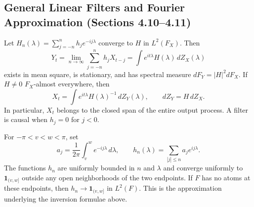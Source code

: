 \subsection{General Linear Filters and Fourier Approximation (Sections 4.10--4.11)}
\begin{theorem}
Let $H_n(\lambda)=\sum_{j=-n}^nh_je^{-ij\lambda}$ converge to $H$ in
$L^2(F_X)$. Then
\[
Y_t=\lim_{n\to\infty}\sum_{j=-n}^nh_jX_{t-j}
=\int e^{it\lambda}H(\lambda)\,dZ_X(\lambda)
\]
exists in mean square, is stationary, and has spectral measure
$dF_Y=|H|^2dF_X$. If $H\ne0$ $F_X$-almost everywhere, then
\[
X_t=\int e^{it\lambda}H(\lambda)^{-1}\,dZ_Y(\lambda),
\qquad dZ_Y=H\,dZ_X.
\]
In particular, $X_t$ belongs to the closed span of the entire output process.
A filter is causal when $h_j=0$ for $j<0$.
\end{theorem}
\begin{proposition}
For $-\pi<v<w<\pi$, set
\[
a_j=\frac1{2\pi}\int_v^w e^{-ij\lambda}\,d\lambda,
\qquad h_n(\lambda)=\sum_{|j|\le n}a_je^{ij\lambda}.
\]
The functions $h_n$ are uniformly bounded in $n$ and $\lambda$ and converge
uniformly to $\mathbf1_{(v,w]}$ outside any open neighborhoods of the two
endpoints. If $F$ has no atoms at these endpoints, then
$h_n\to\mathbf1_{(v,w]}$ in $L^2(F)$. This is the approximation underlying
the inversion formulae above.
\end{proposition}
